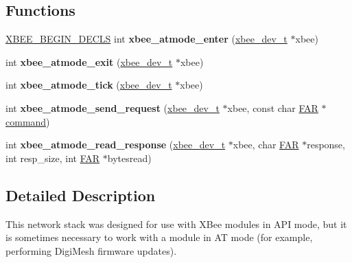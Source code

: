 \subsection*{Functions}
\begin{DoxyCompactItemize}
\item 
\mbox{\label{group__xbee__atmode_ga3955ec8593c4a78108e20050f03a071d}} 
\hyperlink{group__hal_ga336bff4f4a6012aacc4468132bbd3d7f}{X\+B\+E\+E\+\_\+\+B\+E\+G\+I\+N\+\_\+\+D\+E\+C\+LS} int {\bfseries xbee\+\_\+atmode\+\_\+enter} (\hyperlink{structxbee__dev__t}{xbee\+\_\+dev\+\_\+t} $\ast$xbee)
\item 
\mbox{\label{group__xbee__atmode_ga3588aa398a61e724b20112486d9437be}} 
int {\bfseries xbee\+\_\+atmode\+\_\+exit} (\hyperlink{structxbee__dev__t}{xbee\+\_\+dev\+\_\+t} $\ast$xbee)
\item 
\mbox{\label{group__xbee__atmode_ga3c075890a2c8cdbd94d47ed0418f10c7}} 
int {\bfseries xbee\+\_\+atmode\+\_\+tick} (\hyperlink{structxbee__dev__t}{xbee\+\_\+dev\+\_\+t} $\ast$xbee)
\item 
\mbox{\label{group__xbee__atmode_gac814f6775234b54771cf51acd381c1a7}} 
int {\bfseries xbee\+\_\+atmode\+\_\+send\+\_\+request} (\hyperlink{structxbee__dev__t}{xbee\+\_\+dev\+\_\+t} $\ast$xbee, const char \hyperlink{group__hal_gaef060b3456fdcc093a7210a762d5f2ed}{F\+AR} $\ast$\hyperlink{group__xbee__atcmd_ga1a5aaa930940857f68f245eeb89506b5}{command})
\item 
\mbox{\label{group__xbee__atmode_gaba5dc9011c35a28b078fab86e99d24da}} 
int {\bfseries xbee\+\_\+atmode\+\_\+read\+\_\+response} (\hyperlink{structxbee__dev__t}{xbee\+\_\+dev\+\_\+t} $\ast$xbee, char \hyperlink{group__hal_gaef060b3456fdcc093a7210a762d5f2ed}{F\+AR} $\ast$response, int resp\+\_\+size, int \hyperlink{group__hal_gaef060b3456fdcc093a7210a762d5f2ed}{F\+AR} $\ast$bytesread)
\end{DoxyCompactItemize}


\subsection{Detailed Description}
This network stack was designed for use with X\+Bee modules in A\+PI mode, but it is sometimes necessary to work with a module in AT mode (for example, performing Digi\+Mesh firmware updates). 

